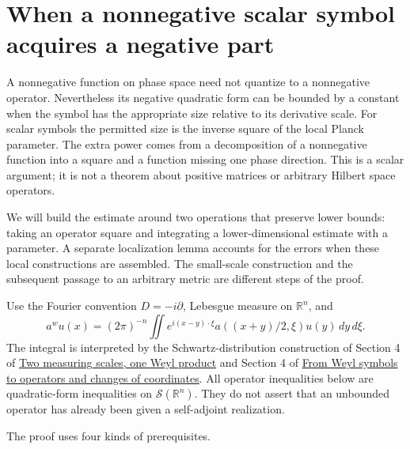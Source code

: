 \documentclass[
  11pt,
]{article}
\author{}
\date{}
\makeatletter
\let\ReaderOriginalAnchorStart\hyper@anchorstart
\let\ReaderOriginalAnchorEnd\hyper@anchorend
\let\ReaderPendingAliases\@empty
\def\ReaderArmAliases#1{\gdef\ReaderPendingAliases{#1}}
\def\hyper@anchorstart#1{\ReaderIfNativeAnchorTF{#1}{\ReaderPendingAliases\global\let\ReaderPendingAliases\@empty}{}\ReaderOriginalAnchorStart{#1}}
\makeatother
\begin{document}
\ReaderArmAliases{\ReaderOriginalAnchorStart{when-a-nonnegative-scalar-symbol-acquires-a-negative-part}\ReaderOriginalAnchorEnd}
\section{When a nonnegative scalar symbol acquires a negative
part}\label{when-a-nonnegative-scalar-symbol-acquires-a-negative-part}

A nonnegative function on phase space need not quantize to a nonnegative
operator. Nevertheless its negative quadratic form can be bounded by a
constant when the symbol has the appropriate size relative to its
derivative scale. For scalar symbols the permitted size is the inverse
square of the local Planck parameter. The extra power comes from a
decomposition of a nonnegative function into a square and a function
missing one phase direction. This is a scalar argument; it is not a
theorem about positive matrices or arbitrary Hilbert space operators.

We will build the estimate around two operations that preserve lower
bounds: taking an operator square and integrating a lower-dimensional
estimate with a parameter. A separate localization lemma accounts for
the errors when these local constructions are assembled. The small-scale
construction and the subsequent passage to an arbitrary metric are
different steps of the proof.

Use the Fourier convention \(D=-i\partial\), Lebesgue measure on
\(\mathbb R^n\), and \[
a^wu(x)=(2\pi)^{-n}\iint e^{i(x-y)\cdot\xi}
 a((x+y)/2,\xi)u(y)\,dy\,d\xi.
\tag{F1}
\] The integral is interpreted by the Schwartz-distribution construction
of Section 4 of \href{weyl-metric-products.pdf}{Two measuring scales, one
Weyl product} and Section 4 of \href{weyl-covariance-action.pdf}{From
Weyl symbols to operators and changes of coordinates}. All operator
inequalities below are quadratic-form inequalities on
\(\mathcal S(\mathbb R^n)\). They do not assert that an unbounded
operator has already been given a self-adjoint realization.

The proof uses four kinds of prerequisites.
\end{document}

